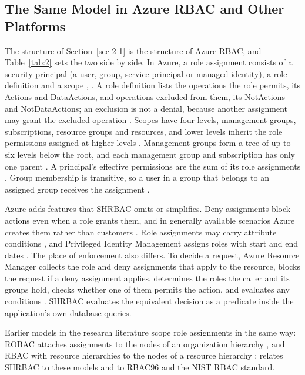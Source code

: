 \documentclass[conference]{IEEEtran}
\begin{document}
\subsection{The Same Model in Azure RBAC and Other Platforms}\label{sec-2-2}

The structure of Section~\ref{sec-2-1} is the structure of Azure RBAC, and Table~\ref{tab:2} sets the two side by side. In Azure, a role assignment consists of a security principal (a user, group, service principal or managed identity), a role definition and a scope \cite{ref1}, \cite{ref11}. A role definition lists the operations the role permits, its Actions and DataActions, and operations excluded from them, its NotActions and NotDataActions; an exclusion is not a denial, because another assignment may grant the excluded operation \cite{ref12}. Scopes have four levels, management groups, subscriptions, resource groups and resources, and lower levels inherit the role permissions assigned at higher levels \cite{ref2}. Management groups form a tree of up to six levels below the root, and each management group and subscription has only one parent \cite{ref13}. A principal's effective permissions are the sum of its role assignments \cite{ref1}. Group membership is transitive, so a user in a group that belongs to an assigned group receives the assignment \cite{ref1}.

Azure adds features that SHRBAC omits or simplifies. Deny assignments block actions even when a role grants them, and in generally available scenarios Azure creates them rather than customers \cite{ref14}. Role assignments may carry attribute conditions \cite{ref11}, and Privileged Identity Management assigns roles with start and end dates \cite{ref15}. The place of enforcement also differs. To decide a request, Azure Resource Manager collects the role and deny assignments that apply to the resource, blocks the request if a deny assignment applies, determines the roles the caller and its groups hold, checks whether one of them permits the action, and evaluates any conditions \cite{ref1}. SHRBAC evaluates the equivalent decision as a predicate inside the application's own database queries.

Earlier models in the research literature scope role assignments in the same way: ROBAC attaches assignments to the nodes of an organization hierarchy \cite{ref16}, and RBAC with resource hierarchies to the nodes of a resource hierarchy \cite{ref17}; \cite{ref8} relates SHRBAC to these models and to RBAC96 and the NIST RBAC standard.
\end{document}
